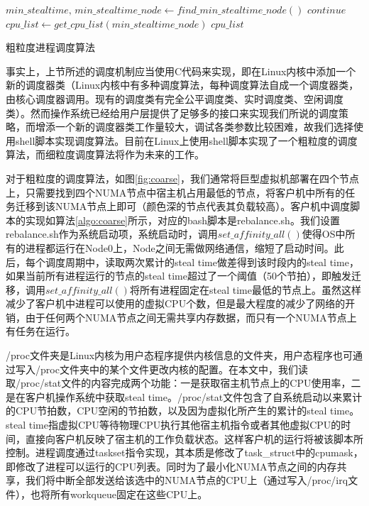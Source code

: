 \begin{algorithm}[h]
\begin{algorithmic}[ruled,1]
\State
{}
\State
{}
\State
{}
\EndFor
\EndFunction
\State
\State
{}
\State
{}
\State
{}
\State $min\_stealtime,\,min\_stealtime\_node \gets find\_min\_stealtime\_node()$
\State $continue$
\EndIf
\State $cpu\_list \gets get\_cpu\_list(min\_stealtime\_node)$
\State
{} {$cpu\_list$}
\EndWhile
\end{algorithmic}
\caption{粗粒度进程调度算法}
\label{algo:coarse}
\end{algorithm}
事实上，上节所述的调度机制应当使用C代码来实现，即在Linux内核中添加一个新的调度器类（Linux内核中有多种调度算法，每种调度算法自成一个调度器类，由核心调度器调用。现有的调度类有完全公平调度类、实时调度类、空闲调度类）。然而操作系统已经给用户层提供了足够多的接口来实现我们所说的调度策略，而增添一个新的调度器类工作量较大，调试各类参数比较困难，故我们选择使用shell脚本实现调度算法。目前在Linux上使用shell脚本实现了一个粗粒度的调度算法，而细粒度调度算法将作为未来的工作。

对于粗粒度的调度算法，如图\ref{fig:coarse}，我们通常将巨型虚拟机部署在四个节点上，只需要找到四个NUMA节点中宿主机占用最低的节点，将客户机中所有的任务迁移到该NUMA节点上即可（颜色深的节点代表其负载较高）。客户机中调度脚本的实现如算法\ref{algo:coarse}所示，对应的bash脚本是rebalance.sh。我们设置rebalance.sh作为系统启动项，系统启动时，调用$set\_affinity\_all()$使得OS中所有的进程都运行在Node0上，Node之间无需做网络通信，缩短了启动时间。此后，每个调度周期中，读取两次累计的steal time做差得到该时段内的steal time，如果当前所有进程运行的节点的steal time超过了一个阈值（50个节拍），即触发迁移，调用$set\_affinity\_all()$将所有进程固定在steal time最低的节点上。虽然这样减少了客户机中进程可以使用的虚拟CPU个数，但是最大程度的减少了网络的开销，由于任何两个NUMA节点之间无需共享内存数据，而只有一个NUMA节点上有任务在运行。

/proc文件夹是Linux内核为用户态程序提供内核信息的文件夹，用户态程序也可通过写入/proc文件夹中的某个文件更改内核的配置。在本文中，我们读取/proc/stat文件的内容完成两个功能：一是获取宿主机节点上的CPU使用率，二是在客户机操作系统中获取steal time。/proc/stat文件包含了自系统启动以来累计的CPU节拍数，CPU空闲的节拍数，以及因为虚拟化所产生的累计的steal time。steal time指虚拟CPU等待物理CPU执行其他宿主机指令或者其他虚拟CPU的时间，直接向客户机反映了宿主机的工作负载状态。这样客户机的运行将被该脚本所控制。进程调度通过taskset指令实现，其本质是修改了task\_struct中的cpumask，即修改了进程可以运行的CPU列表。同时为了最小化NUMA节点之间的内存共享，我们将中断全部发送给该选中的NUMA节点的CPU上（通过写入/proc/irq文件），也将所有workqueue固定在这些CPU上。

